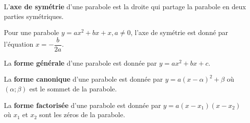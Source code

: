 \documentclass[a4paper,12pt]{report}
\begin{document}
    \begin{defi}
	    L'{\bfseries axe de symétrie} d'une parabole est la droite qui partage la parabole en deux parties symétriques. 
    \end{defi}
    \begin{rem}
    Pour une parabole $y=ax^2+bx+x, a\neq 0$, l'axe de symétrie est donné par l'équation $x=-\dfrac{b}{2a}$.
    \end{rem}
    
    \begin{defi}
	    La {\bfseries forme générale} d'une parabole est donnée par $y=ax^2+bx+c$.
    \end{defi}
    
    \begin{defi}
	    La {\bfseries forme canonique} d'une parabole est donnée par $y=a(x-\alpha)^2+\beta$ où $(\alpha;\beta)$ est le sommet de la parabole.
    \end{defi}

    \begin{defi}
	    La {\bfseries forme factorisée} d'une parabole est donnée par $y=a(x-x_1)(x-x_2)$ où $x_1$ et $x_2$ sont les zéros de la parabole.
    \end{defi}
    
\end{document}
